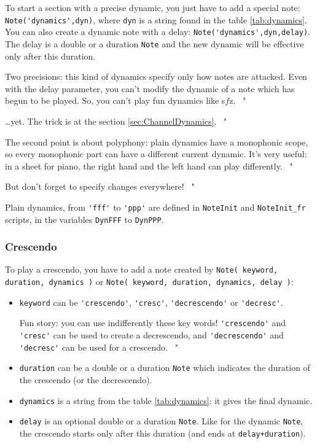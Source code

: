 \documentclass{article}
\newcommand\sfz{s$\!f\!$z\xspace}
\newenvironment{meenv}{ \par \noindent \makebox[6em][r]{ \textcolor{mecolor}{Me}: " --~}}{~"}
\newenvironment{myselfenv}{ \par \noindent \makebox[6em][r]{ \textcolor{myselfcolor}{Myself}: " --~}}{~"}
\newcommand{ \me }[1]{%
\begin{meenv}%
	#1%
\end{meenv} }
\newcommand{ \myself }[1]{%
\begin{myselfenv}%
	#1%
\end{myselfenv} }
\begin{document}
To start a section with a precise dynamic, you just have to add a special note: \lstinline!Note('dynamics',dyn)!, where \lstinline!dyn! is a string found in the table \ref{tab:dynamics}. You can also create a dynamic note with a delay: \lstinline!Note('dynamics',dyn,delay)!. The delay is a double or a duration \lstinline!Note! and the new dynamic will be effective only after this duration.

\myself{Two precisions: this kind of dynamics specify only how notes are attacked. Even with the delay parameter, you can't modify the dynamic of a note which has begun to be played. So, you can't play fun dynamics like \sfz.}
\me{\dots yet. The trick is at the section \ref{sec:ChannelDynamics}.}
\myself{The second point is about polyphony: plain dynamics have a monophonic scope, so every monophonic part can have a different current dynamic. It's very useful: in a sheet for piano, the right hand and the left hand can play differently.}
\me{But don't forget to specify changes everywhere!}

Plain dynamics, from \lstinline!'fff'! to \lstinline!'ppp'! are defined in \lstinline!NoteInit! and \lstinline!NoteInit_fr! scripts, in the variables \lstinline!DynFFF! to \lstinline!DynPPP!.

\subsubsection{Crescendo}
\label{sec:Crescendo}

To play a crescendo, you have to add a note created by \lstinline!Note( keyword, duration, dynamics )! or \lstinline!Note( keyword, duration, dynamics, delay )!:
\begin{itemize}
	\item \lstinline!keyword! can be \lstinline!'crescendo'!, \lstinline!'cresc'!, \lstinline!'decrescendo'! or \lstinline!'decresc'!.
		\me{Fun story: you can use indifferently these key words! \lstinline!'crescendo'! and \lstinline!'cresc'! can be used to create a decrescendo, and \lstinline!'decrescendo'! and \lstinline!'decresc'! can be used for a crescendo.}
	\item \lstinline!duration! can be a double or a duration \lstinline!Note! which indicates the duration of the crescendo (or the decrescendo).
	\item \lstinline!dynamics! is a string from the table \ref{tab:dynamics}: it gives the final dynamic.
	\item \lstinline!delay! is an optional double or a duration \lstinline!Note!. Like for the dynamic \lstinline!Note!, the crescendo starts only after this duration (and ends at \lstinline!delay+duration!).
\end{itemize}
\end{document}
